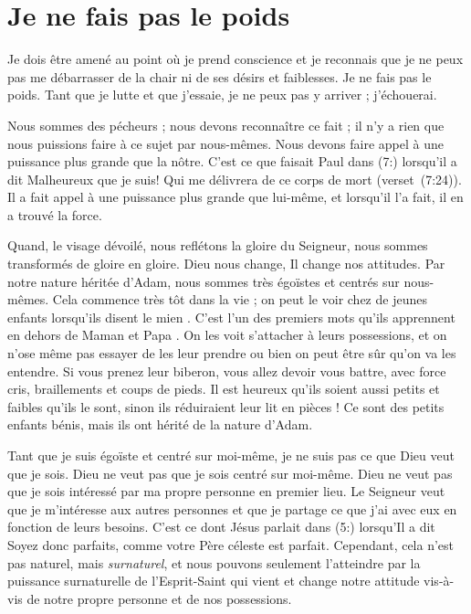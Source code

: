 \section{Je ne fais pas le poids}

Je dois être amené au point où je prend conscience et
 je reconnais que je ne peux pas me débarrasser de la chair
 ni de ses désirs et faiblesses.
 Je ne fais pas le poids. Tant que je lutte et que j'essaie,
 je ne peux pas y arriver ; j'échouerai.

Nous sommes des pécheurs ; nous devons reconnaître ce fait ;
 il n'y a rien que nous puissions faire à ce sujet par nous-mêmes.
 Nous devons faire appel à une puissance plus grande que la nôtre.
 C'est ce que faisait Paul dans (7:) lorsqu'il a dit\frcolon{}
 \Og Malheureux que je suis! Qui me délivrera de ce corps de mort \Fg{}
 (verset~(7:24)).
 Il a fait appel à une puissance plus grande que lui-même,
 et lorsqu'il l'a fait, il en a trouvé la force.

Quand, le visage dévoilé, nous reflétons la gloire du Seigneur,
 nous sommes transformés de gloire en gloire.
 Dieu nous change, Il change nos attitudes.
 Par notre nature héritée d'Adam, nous sommes très égoïstes
 et centrés sur nous-mêmes.
 Cela commence très tôt dans la vie ; on peut le voir chez de jeunes enfants
 lorsqu'ils disent \Og le mien \Fg{}.
 C'est l'un des premiers mots qu'ils apprennent
 en dehors de \Og Maman \Fg{} et \Og Papa \Fg{}.
 On les voit s'attacher à leurs possessions, et on n'ose même pas
 essayer de les leur prendre ou bien on peut être sûr qu'on va les entendre.
 Si vous prenez leur biberon, vous allez devoir vous battre,
 avec force cris, braillements et coups de pieds.
 Il est heureux qu'ils soient aussi petits et faibles qu'ils le sont,
 sinon ils réduiraient leur lit en pièces !
 Ce sont des petits enfants bénis,
 mais ils ont hérité de la nature d'Adam.

Tant que je suis égoïste et centré sur moi-même,
 je ne suis pas ce que Dieu veut que je sois.
 Dieu ne veut pas que je sois centré sur moi-même.
 Dieu ne veut pas que je sois intéressé par ma propre personne
 en premier lieu.
 Le Seigneur veut que je m'intéresse aux autres personnes et que
 je partage ce que j'ai avec eux en fonction de leurs besoins.
 C'est ce dont Jésus parlait dans (5:) lorsqu'Il a dit\frcolon{}
 \Og Soyez donc parfaits, comme votre Père céleste est parfait. \Fg{}
 Cependant, cela n'est pas naturel, mais \emph{surnaturel},
 et nous pouvons seulement
 l'atteindre par la puissance surnaturelle de l'Esprit-Saint
 qui vient et change notre attitude vis-à-vis de notre propre personne
 et de nos possessions.

